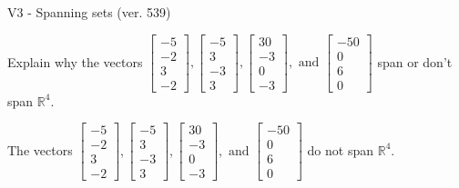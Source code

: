 \begin{exercise}
  \begin{exerciseTitle}V3 - Spanning sets (ver. 539)\end{exerciseTitle}
  \begin{exerciseStatement}
    Explain why the vectors \(\left[\begin{array}{r}
-5 \\
-2 \\
3 \\
-2
\end{array}\right] , \left[\begin{array}{r}
-5 \\
3 \\
-3 \\
3
\end{array}\right] , \left[\begin{array}{r}
30 \\
-3 \\
0 \\
-3
\end{array}\right] , \text{ and } \left[\begin{array}{r}
-50 \\
0 \\
6 \\
0
\end{array}\right]\) span or don't span \(\mathbb{R}^4\). 
	


  \end{exerciseStatement}
  \begin{exerciseAnswer}
   The vectors \(\left[\begin{array}{r}
-5 \\
-2 \\
3 \\
-2
\end{array}\right] , \left[\begin{array}{r}
-5 \\
3 \\
-3 \\
3
\end{array}\right] , \left[\begin{array}{r}
30 \\
-3 \\
0 \\
-3
\end{array}\right] , \text{ and } \left[\begin{array}{r}
-50 \\
0 \\
6 \\
0
\end{array}\right]\) 
  	 do not  
	span \(\mathbb{R}^4\).
  


  \end{exerciseAnswer}
\end{exercise}